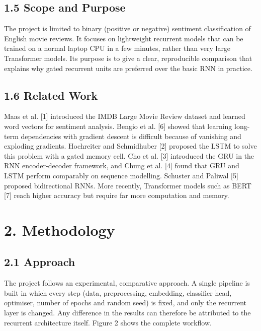 \documentclass[12pt,a4paper,oneside]{report}
\begin{document}
\section*{1.5 Scope and Purpose}
The project is limited to binary (positive or negative) sentiment classification of English movie reviews. It focuses on lightweight recurrent models that can be trained on a normal laptop CPU in a few minutes, rather than very large Transformer models. Its purpose is to give a clear, reproducible comparison that explains why gated recurrent units are preferred over the basic RNN in practice.

\section*{1.6 Related Work}
Maas et al. [1] introduced the IMDB Large Movie Review dataset and learned word vectors for sentiment analysis. Bengio et al. [6] showed that learning long-term dependencies with gradient descent is difficult because of vanishing and exploding gradients. Hochreiter and Schmidhuber [2] proposed the LSTM to solve this problem with a gated memory cell. Cho et al. [3] introduced the GRU in the RNN encoder-decoder framework, and Chung et al. [4] found that GRU and LSTM perform comparably on sequence modelling. Schuster and Paliwal [5] proposed bidirectional RNNs. More recently, Transformer models such as BERT [7] reach higher accuracy but require far more computation and memory.

\chapter*{2. Methodology}
\section*{2.1 Approach}
The project follows an experimental, comparative approach. A single pipeline is built in which every step (data, preprocessing, embedding, classifier head, optimiser, number of epochs and random seed) is fixed, and only the recurrent layer is changed. Any difference in the results can therefore be attributed to the recurrent architecture itself. Figure 2 shows the complete workflow.
\end{document}
